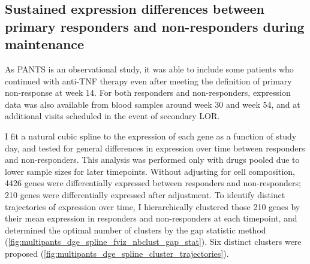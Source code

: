 \subsection{Sustained expression differences between primary responders and non-responders during maintenance}

As \gls{PANTS} is an observational study, it was able to include some patients who continued with anti-\gls{TNF} therapy
even after meeting the definition of primary non-response at week 14.
For both responders and non-responders, expression data was also available from blood samples around week 30 and week 54, and at additional visits scheduled in the event of secondary LOR.

I fit a natural cubic spline to the expression of each gene as a function of study day, and tested for general differences in expression over time between responders and non-responders.
This analysis was performed only with drugs pooled due to lower sample sizes for later timepoints.
Without adjusting for cell composition, 
4426 genes were differentially expressed between responders and non-responders;
210 genes were differentially expressed after adjustment.
To identify distinct trajectories of expression over time, I hierarchically clustered those 210 genes by
their mean expression in responders and non-responders at each timepoint, 
and determined the optimal number of clusters by the gap statistic method (\cref{fig:multipants_dge_spline_fviz_nbclust_gap_stat}).
Six distinct clusters were proposed (\cref{fig:multipants_dge_spline_cluster_trajectories}).

